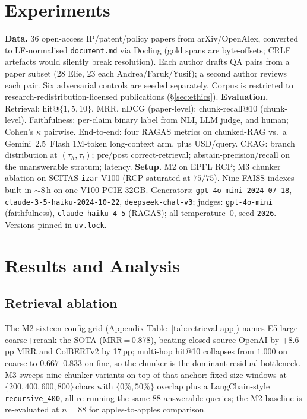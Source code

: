 \documentclass[11pt]{article}
\begin{document}
\section{Experiments}
\label{sec:exp}

\textbf{Data.} 36 open-access IP/patent/policy papers from arXiv/OpenAlex, converted to LF-normalised \texttt{document.md} via Docling (gold spans are byte-offsets; CRLF artefacts would silently break resolution). Each author drafts QA pairs from a paper subset (28 Elie, 23 each Andrea/Faruk/Yusif); a second author reviews each pair. Six adversarial controls are seeded separately. Corpus is restricted to research-redistribution-licensed publications (\S\ref{sec:ethics}). \textbf{Evaluation.} Retrieval: hit@$\{1,5,10\}$, MRR, nDCG (paper-level); chunk-recall@10 (chunk-level). Faithfulness: per-claim binary label from NLI, LLM judge, and human; Cohen's $\kappa$ pairwise. End-to-end: four RAGAS metrics \citep{es2024ragas} on chunked-RAG vs.\ a Gemini~2.5~Flash 1M-token long-context arm, plus USD/query. CRAG: branch distribution at $(\tau_h,\tau_l)$; pre/post correct-retrieval; abstain-precision/recall on the unanswerable stratum; latency. \textbf{Setup.} M2 on EPFL RCP; M3 chunker ablation on SCITAS \texttt{izar} V100 (RCP saturated at $75/75$). Nine FAISS indexes built in $\sim$8\,h on one V100-PCIE-32GB. Generators: \texttt{gpt-4o-mini-2024-07-18}, \texttt{claude-3-5-haiku-2024-10-22}, \texttt{deepseek-chat-v3}; judges: \texttt{gpt-4o-mini} (faithfulness), \texttt{claude-haiku-4-5} (RAGAS); all temperature~0, seed \texttt{2026}. Versions pinned in \texttt{uv.lock}.


\section{Results and Analysis}
\label{sec:results}

\subsection{Retrieval ablation}
\label{sec:retrieval}

The M2 sixteen-config grid (Appendix Table~\ref{tab:retrieval-app}) names E5-large \citep{wang2024e5} coarse$+$rerank the SOTA (MRR\,=\,0.878), beating closed-source OpenAI by $+8.6$\,pp MRR and ColBERTv2 \citep{santhanam2022colbertv2} by 17\,pp; multi-hop hit@10 collapses from $1.000$ on coarse to $0.667$--$0.833$ on fine, so the chunker is the dominant residual bottleneck. M3 sweeps nine chunker variants on top of that anchor: fixed-size windows at $\{200, 400, 600, 800\}$\,chars with $\{0\%, 50\%\}$ overlap plus a LangChain-style \texttt{recursive\_400}, all re-running the same 88 answerable queries; the M2 baseline is re-evaluated at $n{=}88$ for apples-to-apples comparison.
\end{document}
